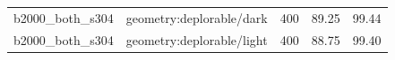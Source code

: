 \begin{longtable}{l>{\raggedright\arraybackslash}p{.42\linewidth}rrr}
b2000\_\allowbreak{}both\_\allowbreak{}s304 & %
geometry:deplorable/dark & %
400 & %
89.25 & %
99.44 \\ %

b2000\_\allowbreak{}both\_\allowbreak{}s304 & %
geometry:deplorable/light & %
400 & %
88.75 & %
99.40 \\ %


\end{longtable}
